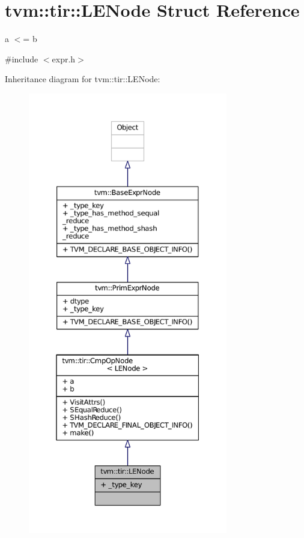 \hypertarget{structtvm_1_1tir_1_1LENode}{}\section{tvm\+:\+:tir\+:\+:L\+E\+Node Struct Reference}
\label{structtvm_1_1tir_1_1LENode}


a $<$= b  




{\ttfamily \#include $<$expr.\+h$>$}



Inheritance diagram for tvm\+:\+:tir\+:\+:L\+E\+Node\+:
\nopagebreak
\begin{figure}[H]
\begin{center}
\leavevmode
\includegraphics[height=550pt]{structtvm_1_1tir_1_1LENode__inherit__graph}
\end{center}
\end{figure}


